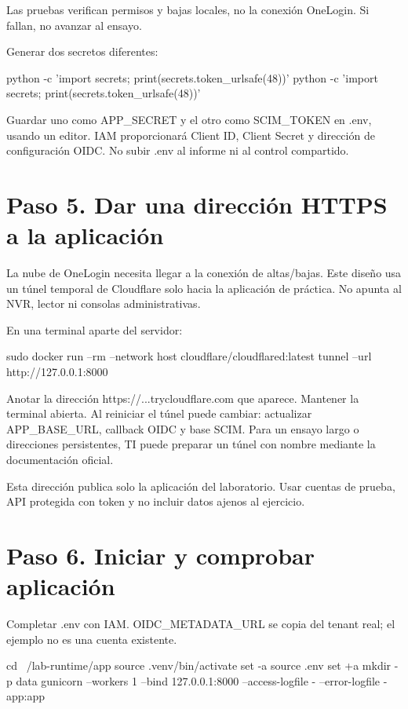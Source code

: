 \documentclass[12pt,a4paper]{article}
\begin{document}
Las pruebas verifican permisos y bajas locales, no la conexión OneLogin. Si fallan, no avanzar al ensayo.\par
Generar dos secretos diferentes:\par
{}
\begin{Comandos}
python -c 'import secrets; print(secrets.token_urlsafe(48))'
python -c 'import secrets; print(secrets.token_urlsafe(48))'
\end{Comandos}
Guardar uno como APP\_SECRET y el otro como SCIM\_TOKEN en \textnormal{.env}, usando un editor. IAM proporcionará Client ID, Client Secret y dirección de configuración OIDC. No subir \textnormal{.env} al informe ni al control compartido.\par
{}\section*{Paso 5. Dar una dirección HTTPS a la aplicación}
La nube de OneLogin necesita llegar a la conexión de altas/bajas. Este diseño usa un túnel temporal de Cloudflare solo hacia la aplicación de práctica. No apunta al NVR, lector ni consolas administrativas.\par
En una terminal aparte del servidor:\par
{}
\begin{Comandos}
sudo docker run --rm --network host cloudflare/cloudflared:latest tunnel --url http://127.0.0.1:8000
\end{Comandos}
Anotar la dirección \textnormal{https:/\allowbreak{}/\allowbreak{}...trycloudflare.com} que aparece. Mantener la terminal abierta. Al reiniciar el túnel puede cambiar: actualizar APP\_BASE\_URL, callback OIDC y base SCIM. Para un ensayo largo o direcciones persistentes, TI puede preparar un túnel con nombre mediante la documentación oficial.\par
Esta dirección publica solo la aplicación del laboratorio. Usar cuentas de prueba, API protegida con token y no incluir datos ajenos al ejercicio.\par
{}\section*{Paso 6. Iniciar y comprobar aplicación}
Completar \textnormal{.env} con IAM. OIDC\_METADATA\_URL se copia del tenant real; el ejemplo no es una cuenta existente.\par
{}
\begin{Comandos}
cd ~/lab-runtime/app
source .venv/bin/activate
set -a
source .env
set +a
mkdir -p data
gunicorn --workers 1 --bind 127.0.0.1:8000 --access-logfile - --error-logfile - app:app
\end{Comandos}
\end{document}
